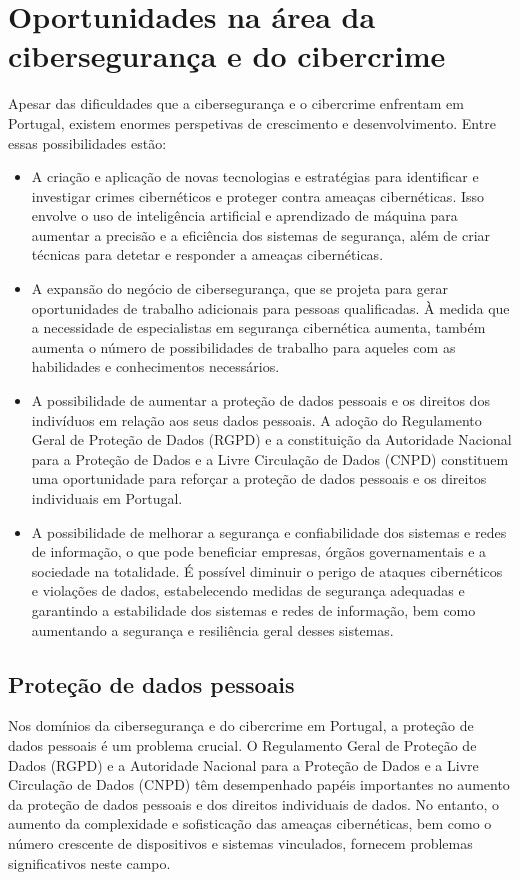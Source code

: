 \section{Oportunidades na área da cibersegurança e do cibercrime}

Apesar das dificuldades que a cibersegurança e o cibercrime enfrentam em Portugal, existem enormes perspetivas de crescimento e desenvolvimento. Entre essas possibilidades estão:

\begin{itemize}
  \item A criação e aplicação de novas tecnologias e estratégias para identificar e investigar crimes cibernéticos e proteger contra ameaças cibernéticas. Isso envolve o uso de inteligência artificial e aprendizado de máquina para aumentar a precisão e a eficiência dos sistemas de segurança, além de criar técnicas para detetar e responder a ameaças cibernéticas.
  \item A expansão do negócio de cibersegurança, que se projeta para gerar oportunidades de trabalho adicionais para pessoas qualificadas. À medida que a necessidade de especialistas em segurança cibernética aumenta, também aumenta o número de possibilidades de trabalho para aqueles com as habilidades e conhecimentos necessários.
  \item A possibilidade de aumentar a proteção de dados pessoais e os direitos dos indivíduos em relação aos seus dados pessoais. A adoção do Regulamento Geral de Proteção de Dados (RGPD) e a constituição da Autoridade Nacional para a Proteção de Dados e a Livre Circulação de Dados (CNPD) constituem uma oportunidade para reforçar a proteção de dados pessoais e os direitos individuais em Portugal.
  \item A possibilidade de melhorar a segurança e confiabilidade dos sistemas e redes de informação, o que pode beneficiar empresas, órgãos governamentais e a sociedade na totalidade. É possível diminuir o perigo de ataques cibernéticos e violações de dados, estabelecendo medidas de segurança adequadas e garantindo a estabilidade dos sistemas e redes de informação, bem como aumentando a segurança e resiliência geral desses sistemas.
\end{itemize}

\subsection{Proteção de dados pessoais}

Nos domínios da cibersegurança e do cibercrime em Portugal, a proteção de dados pessoais é um problema crucial. O Regulamento Geral de Proteção de Dados (RGPD) e a Autoridade Nacional para a Proteção de Dados e a Livre Circulação de Dados (CNPD) têm desempenhado papéis importantes no aumento da proteção de dados pessoais e dos direitos individuais de dados. No entanto, o aumento da complexidade e sofisticação das ameaças cibernéticas, bem como o número crescente de dispositivos e sistemas vinculados, fornecem problemas significativos neste campo.

